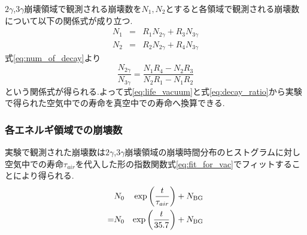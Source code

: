 $2\gamma$,$3\gamma$崩壊領域で観測される崩壊数を$N_1,N_2$とすると各領域で観測される崩壊数について以下の関係式が成り立つ.
\begin{eqnarray}
	N_1&=&R_1N_{2\gamma}+R_3N_{3\gamma} \\
	N_2&=&R_2N_{2\gamma}+R_4N_{3\gamma}
	\label{eq:num_of_decay}
\end{eqnarray}
式\ref{eq:num_of_decay}より
\begin{equation}
	\frac{N_{2\gamma}}{N_{3\gamma}}=\frac{N_1R_4-N_2R_3}{N_2R_1-N_1R_2}
	\label{eq:decay_ratio}
\end{equation}
という関係式が得られる.よって式\ref{eq:life_vacuum}と式\ref{eq:decay_ratio}から実験で得られた空気中での寿命を真空中での寿命へ換算できる.

\subsubsection{各エネルギ領域での崩壊数}
実験で観測された崩壊数は$2\gamma$,$3\gamma$崩壊領域の崩壊時間分布のヒストグラムに対し空気中での寿命$\tau_{air}$を代入した形の指数関数式\ref{eq:fit_for_vac}でフィットすることにより得られる.
\begin{eqnarray}
	&N_0&\exp\left(\frac{t}{\tau_{air}}\right)+N_{\rm BG} \nonumber \\
	=&N_0&\exp\left(\frac{t}{35.7}\right)+N_{\rm BG} 
\end{eqnarray}


